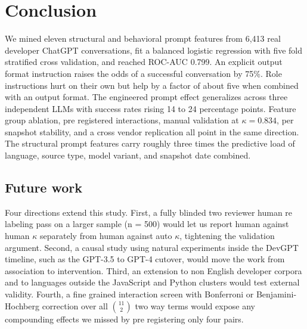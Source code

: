 \documentclass[conference]{IEEEtran}
\begin{document}
\section{Conclusion}\label{sec:conclusion}
We mined eleven structural and behavioral prompt features from 6{,}413 real developer ChatGPT conversations, fit a balanced logistic regression with five fold stratified cross validation, and reached ROC-AUC 0.799. An explicit output format instruction raises the odds of a successful conversation by 75\%. Role instructions hurt on their own but help by a factor of about five when combined with an output format. The engineered prompt effect generalizes across three independent LLMs with success rates rising 14 to 24 percentage points. Feature group ablation, pre registered interactions, manual validation at $\kappa = 0.834$, per snapshot stability, and a cross vendor replication all point in the same direction. The structural prompt features carry roughly three times the predictive load of language, source type, model variant, and snapshot date combined.

\subsection{Future work}
Four directions extend this study. First, a fully blinded two reviewer human re labeling pass on a larger sample (n = 500) would let us report human against human $\kappa$ separately from human against auto $\kappa$, tightening the validation argument. Second, a causal study using natural experiments inside the DevGPT timeline, such as the GPT-3.5 to GPT-4 cutover, would move the work from association to intervention. Third, an extension to non English developer corpora and to languages outside the JavaScript and Python clusters would test external validity. Fourth, a fine grained interaction screen with Bonferroni or Benjamini-Hochberg correction over all $\binom{11}{2}$ two way terms would expose any compounding effects we missed by pre registering only four pairs.
\end{document}
